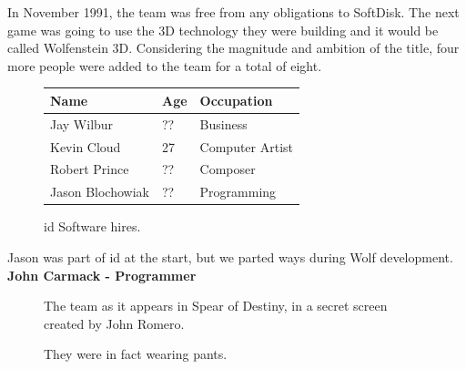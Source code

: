 \documentclass[book.tex]{subfiles}
\begin{document}
In November 1991, the team was free from any obligations to SoftDisk. The next game was going to use the 3D technology they were building and it would be called Wolfenstein 3D. Considering the magnitude and ambition of the title, four more people were added to the team for a total of eight.\\
 \begin{figure}[H]
\centering  
\begin{tabularx}{\textwidth}{ X  X  X  }
  \toprule
  \textbf{Name} &  \textbf{Age} & \textbf{Occupation} \\
  \toprule 
   Jay Wilbur & ?? &  Business\\
   Kevin Cloud\protect\footnotemark{} & 27 &  Computer Artist\\
   Robert Prince & ?? &  Composer\\
   Jason Blochowiak\protect\footnotemark{} & ?? &   Programming\\
     \toprule
\end{tabularx}
\caption{id Software hires.}\label{fig:Id Software hires}
\end{figure}

\begin{fancyquotes}
Jason was part of id at the start, but we parted ways during Wolf development.
 \bigskip \\
\textbf{John Carmack - Programmer}
 \end{fancyquotes}
 
\begin{figure}[H]
\centering
\caption{The team as it appears in Spear of Destiny, in a secret screen created by John Romero.}
\label{fig:id_team_1993}
\end{figure}
 
\begin{figure}[H]
\centering
\caption{They were in fact wearing pants.}
\label{fig:id_team_1993}
\end{figure}
\end{document}

